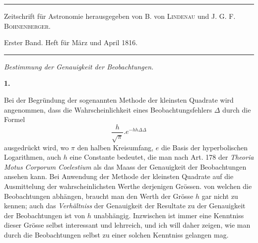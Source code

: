 \clearpage
{}
\begin{center}
\rule{.8\linewidth}{.3pt}\par\smallskip
{\small Zeitschrift für Astronomie herausgegeben von B. von \textsc{Lindenau} und J. G. F. \textsc{Bohnenberger}.\par
Erster Band. Heft für März und April 1816.\par}
\smallskip\rule{.8\linewidth}{.3pt}\par\bigskip
{\large\itshape Bestimmung der Genauigkeit der Beobachtungen.\par}
\end{center}
\renewcommand{\Article}[1]{\par\medskip\Needspace{4\baselineskip}\pdfbookmark[1]{Art. #1}{genauigkeit-art-#1}\centerline{\textbf{#1.}}\nobreak\smallskip}
\Article{1}
Bei der Begründung der sogenannten Methode der kleinsten Quadrate wird angenommen, dass die Wahrscheinlichkeit eines Beobachtungsfehlers \(\Delta\) durch die Formel
\[
\frac{h}{\surd\pi}.e^{-hh\Delta\Delta}
\]
ausgedrückt wird, wo \(\pi\) den halben Kreisumfang, \(e\) die Basis der hyperbolischen Logarithmen, auch \(h\) eine Constante bedeutet, die man nach Art. 178 der \textit{Theoria Motus Corporum Coelestium} als das Maass der Genauigkeit der Beobachtungen ansehen kann. Bei Anwendung der Methode der kleinsten Quadrate auf die Ausmittelung der wahrscheinlichsten Werthe derjenigen Grössen. von welchen die Beobachtungen abhängen, braucht man den Werth der Grösse \(h\) gar nicht zu kennen; auch das \textit{Verhältniss} der Genauigkeit der Resultate zu der Genauigkeit der Beobachtungen ist von \(h\) unabhängig. Inzwischen ist immer eine Kenntniss dieser Grösse selbst interessant und lehrreich, und ich will daher zeigen, wie man durch die Beobachtungen selbst zu einer solchen Kenntniss gelangen mag.

